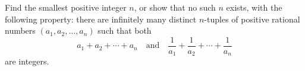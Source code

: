 Find the smallest positive integer $n$, or show that no such $n$ exists, with the following property: there are infinitely many distinct $n$-tuples of positive rational numbers $(a_1, a_2, \ldots, a_n)$ such that both
\[
a_1 + a_2 + \cdots + a_n \quad \text{and} \quad \frac{1}{a_1} + \frac{1}{a_2} + \cdots + \frac{1}{a_n}
\]
are integers.
